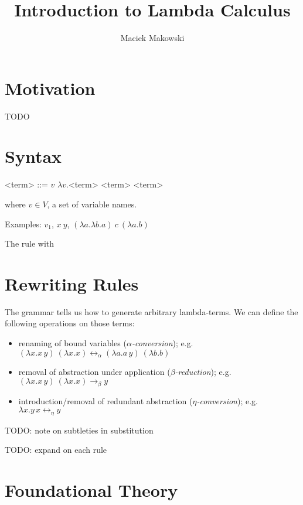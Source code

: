 \documentclass[11pt,twoside,a4paper]{article} %
\begin{document}
\title{Introduction to Lambda Calculus}
\author{Maciek Makowski}
\maketitle

\section{Motivation}

TODO

\section{Syntax}

\setlength{\grammarindent}{6em} 
\begin{grammar}
<term> ::= $v$ 
   \alt $\lambda v.$<term> 
   \alt <term> <term>
\end{grammar}
where $v\in V$, a set of variable names.

Examples: $v_1$, $x\ y$, $(\lambda a.\lambda b.a)\ c\ (\lambda a.b)$

The rule with 

\section{Rewriting Rules}

The grammar tells us how to generate arbitrary lambda-terms. We can define the
following operations on those terms:
\begin{itemize}
\item renaming of bound variables (\emph{$\alpha$-conversion}); e.g. $(\lambda
x.x\,y)\ (\lambda x.x)\longleftrightarrow_\alpha(\lambda
a.a\,y)\ (\lambda b.b)$
\item removal of abstraction under application (\emph{$\beta$-reduction}); e.g. $(\lambda
x.x\,y)\ (\lambda x.x)\longrightarrow_\beta y$
\item introduction/removal of redundant abstraction (\emph{$\eta$-conversion});
e.g. $\lambda x.y\,x\longleftrightarrow_\eta y$
\end{itemize}
TODO: note on subtleties in substitution

TODO: expand on each rule

\section{Foundational Theory}
\end{document}
